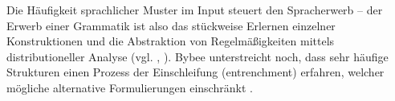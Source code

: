 Die Häufigkeit sprachlicher Muster im Input steuert den Spracherwerb -- der Erwerb einer Grammatik ist also das stückweise Erlernen einzelner Konstruktionen und die Abstraktion von Regelmäßigkeiten mittels distributioneller Analyse (vgl. \cite[S.71]{Ellis08}, \cite{Bybee06}).
Bybee \cite[S.715]{Bybee06} unterstreicht noch, dass sehr häufige Strukturen einen Prozess der Einschleifung (entrenchment) erfahren, welcher mögliche alternative Formulierungen einschränkt \cite[vgl. dazu auch][S.30]{Tomasello06}.










